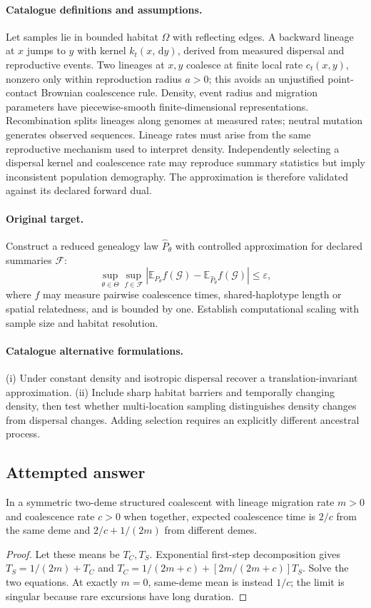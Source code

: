 \documentclass[11pt]{article}
\begin{document}
\paragraph{Catalogue definitions and assumptions.}
Let samples lie in bounded habitat $\Omega$ with reflecting edges. A backward lineage at $x$ jumps to $y$ with kernel $k_t(x,\,\mathrm{d} y)$, derived from measured dispersal and reproductive events. Two lineages at $x,y$ coalesce at finite local rate $c_t(x,y)$, nonzero only within reproduction radius $a>0$; this avoids an unjustified point-contact Brownian coalescence rule. Density, event radius and migration parameters have piecewise-smooth finite-dimensional representations. Recombination splits lineages along genomes at measured rates; neutral mutation generates observed sequences. Lineage rates must arise from the same reproductive mechanism used to interpret density. Independently selecting a dispersal kernel and coalescence rate may reproduce summary statistics but imply inconsistent population demography. The approximation is therefore validated against its declared forward dual.
\paragraph{Original target.}
Construct a reduced genealogy law $\widehat P_\theta$ with controlled approximation for declared summaries $\mathcal F$:
\[
 \sup_{\theta\in\Theta}\sup_{f\in\mathcal F}
 |\mathbb{E}_{P_\theta}f(\mathcal G)-\mathbb{E}_{\widehat P_\theta}f(\mathcal G)|
 \le\varepsilon,
\]
where $f$ may measure pairwise coalescence times, shared-haplotype length or spatial relatedness, and is bounded by one. Establish computational scaling with sample size and habitat resolution.
\paragraph{Catalogue alternative formulations.}
(i) Under constant density and isotropic dispersal recover a translation-invariant approximation. (ii) Include sharp habitat barriers and temporally changing density, then test whether multi-location sampling distinguishes density changes from dispersal changes. Adding selection requires an explicitly different ancestral process.
\subsection{Attempted answer}
\begin{proposition}
In a symmetric two-deme structured coalescent with lineage migration rate $m>0$ and coalescence rate $c>0$ when together, expected coalescence time is $2/c$ from the same deme and $2/c+1/(2m)$ from different demes.
\end{proposition}
\begin{proof}
Let these means be $T_C,T_S$. Exponential first-step decomposition gives $T_S=1/(2m)+T_C$ and $T_C=1/(2m+c)+[2m/(2m+c)]T_S$. Solve the two equations. At exactly $m=0$, same-deme mean is instead $1/c$; the limit is singular because rare excursions have long duration.
\end{proof}
\end{document}
